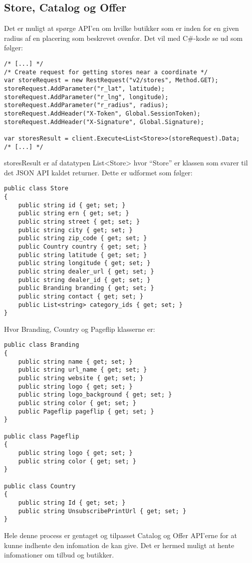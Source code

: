\subsection{Store, Catalog og Offer}
Det er muligt at spørge API'en om hvilke butikker som er inden for en given radius af en placering som beskrevet ovenfor.
Det vil med C\#-kode se ud som følger:
\begin{lstlisting}[caption="C\#-kode som anvender ``/v2/stores'' delen af API'en til at hente butikker.",label=apistorecs]
/* [...] */
/* Create request for getting stores near a coordinate */ 
var storeRequest = new RestRequest("v2/stores", Method.GET);
storeRequest.AddParameter("r_lat", latitude);
storeRequest.AddParameter("r_lng", longitude);
storeRequest.AddParameter("r_radius", radius);
storeRequest.AddHeader("X-Token", Global.SessionToken);
storeRequest.AddHeader("X-Signature", Global.Signature);

var storesResult = client.Execute<List<Store>>(storeRequest).Data;
/* [...] */
\end{lstlisting}

storesResult er af datatypen List<Store> hvor ``Store'' er klassen som svarer til det JSON API kaldet returner. 
Dette er udformet som følger:
\begin{lstlisting}[caption="Klassen Store",label=apistoreclass]
public class Store
{
    public string id { get; set; }
    public string ern { get; set; }
    public string street { get; set; }
    public string city { get; set; }
    public string zip_code { get; set; }
    public Country country { get; set; }
    public string latitude { get; set; }
    public string longitude { get; set; }
    public string dealer_url { get; set; }
    public string dealer_id { get; set; }
    public Branding branding { get; set; }
    public string contact { get; set; }
    public List<string> category_ids { get; set; }
}
\end{lstlisting}

Hvor Branding, Country og Pageflip klasserne er:

\begin{lstlisting}[caption="Klasserne Branding Pageflip og Country",label=apistoreclasshelpers]
public class Branding
{
    public string name { get; set; }
    public string url_name { get; set; }
    public string website { get; set; }
    public string logo { get; set; }
    public string logo_background { get; set; }
    public string color { get; set; }
    public Pageflip pageflip { get; set; }
}

public class Pageflip
{
    public string logo { get; set; }
    public string color { get; set; }
}

public class Country
{
    public string Id { get; set; }
    public string UnsubscribePrintUrl { get; set; }
}
\end{lstlisting}

Hele denne process er gentaget og tilpasset Catalog og Offer API'erne for at kunne indhente den infomation de kan give. 
Det er hermed muligt at hente infomationer om tilbud og butikker. 
